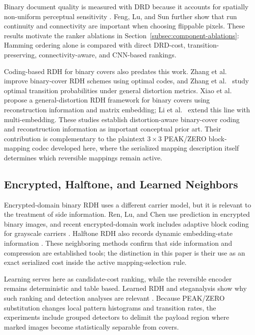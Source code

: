 \documentclass[a4paper,fleqn]{cas-dc}
\newcommand{\RevisionAddBegin}{\begingroup}
\newcommand{\RevisionAddEnd}{\endgroup}
\newcommand{\RevisionAddBegin}{\begingroup\color{revisionblue}}
\newcommand{\RevisionAddEnd}{\endgroup}
\begin{document}
\RevisionAddBegin
Binary document quality is measured with DRD because it accounts for spatially
non-uniform perceptual sensitivity \cite{Lu2004DRD}. Feng, Lu, and Sun
\cite{Feng2015Secure} further show that run continuity and connectivity are
important when choosing flippable pixels. These results motivate the ranker
ablations in Section~\ref{subsec:component-ablations}: Hamming ordering alone
is compared with direct DRD-cost, transition-preserving, connectivity-aware,
and CNN-based rankings.
\RevisionAddEnd

\RevisionAddBegin
Coding-based RDH for binary covers also predates this work. Zhang et al.\
\cite{Zhang2012OptimalCodes} improve binary-cover RDH schemes using optimal
codes, and Zhang et al.\ \cite{Zhang2015OptimalTransition} study optimal
transition probabilities under general distortion metrics. Xiao et al.\
\cite{Xiao2022BinaryCovers} propose a general-distortion RDH framework for
binary covers using reconstruction information and matrix embedding; Li et
al.\ \cite{Li2023MultiEmbedding} extend this line with multi-embedding.
These studies establish distortion-aware binary-cover coding and
reconstruction information as important conceptual prior art. Their
contribution is complementary to the plaintext $3\times3$ PEAK/ZERO
block-mapping codec developed here, where the serialized mapping description
itself determines which reversible mappings remain active.
\RevisionAddEnd

\RevisionAddBegin
\subsection{Encrypted, Halftone, and Learned Neighbors}
\RevisionAddEnd

\RevisionAddBegin
Encrypted-domain binary RDH uses a different carrier model, but it is relevant
to the treatment of side information. Ren, Lu, and Chen
\cite{Ren2019Encrypted} use prediction in encrypted binary images, and recent
encrypted-domain work includes adaptive block coding for grayscale carriers
\cite{Xiao2024AdaptiveBlock}. Halftone RDH also records dynamic embedding-state
information \cite{Yin2021HalftoneDESG}. These neighboring methods confirm
that side information and compression are established tools; the distinction
in this paper is their use as an exact serialized cost inside the active
mapping-selection rule.
\RevisionAddEnd

\RevisionAddBegin
Learning serves here as candidate-cost ranking, while the reversible encoder
remains deterministic and table based. Learned RDH and steganalysis show why
such ranking and detection analyses are relevant \cite{Li2021LearnedRDH,Boroumand2019SRNet,
Yedroudj2018Net,Zhang2019SRNet}. Because PEAK/ZERO substitution changes local
pattern histograms and transition rates, the experiments include grouped
detectors to delimit the payload region where marked images become
statistically separable from covers.
\RevisionAddEnd
\end{document}
